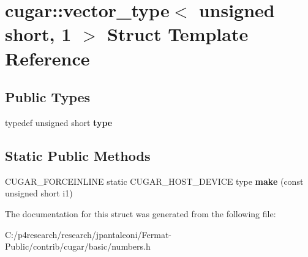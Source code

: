 \hypertarget{structcugar_1_1vector__type_3_01unsigned_01short_00_011_01_4}{}\section{cugar\+:\+:vector\+\_\+type$<$ unsigned short, 1 $>$ Struct Template Reference}
\label{structcugar_1_1vector__type_3_01unsigned_01short_00_011_01_4}
\subsection*{Public Types}
\begin{DoxyCompactItemize}
\item 
\mbox{\label{structcugar_1_1vector__type_3_01unsigned_01short_00_011_01_4_acb278a2f84b7227bc4339e4305a5b131}} 
typedef unsigned short {\bfseries type}
\end{DoxyCompactItemize}
\subsection*{Static Public Methods}
\begin{DoxyCompactItemize}
\item 
\mbox{\label{structcugar_1_1vector__type_3_01unsigned_01short_00_011_01_4_a4d3acaa3afb1a0fb32c6ac82b8af4c2c}} 
C\+U\+G\+A\+R\+\_\+\+F\+O\+R\+C\+E\+I\+N\+L\+I\+NE static C\+U\+G\+A\+R\+\_\+\+H\+O\+S\+T\+\_\+\+D\+E\+V\+I\+CE type {\bfseries make} (const unsigned short i1)
\end{DoxyCompactItemize}


The documentation for this struct was generated from the following file\+:\begin{DoxyCompactItemize}
\item 
C\+:/p4research/research/jpantaleoni/\+Fermat-\/\+Public/contrib/cugar/basic/numbers.\+h\end{DoxyCompactItemize}
